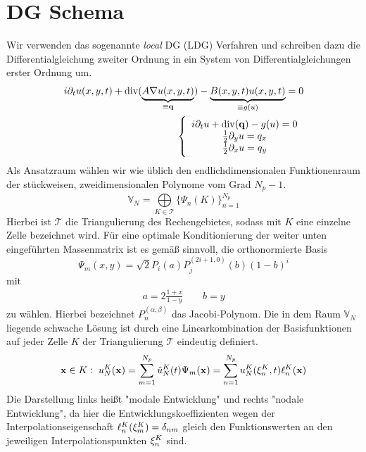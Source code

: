 \section{DG Schema}
\label{sec:DG-Schema}
Wir verwenden das sogenannte \emph{local} DG (LDG) Verfahren \cite{cockburnLDG} und schreiben dazu die Differentialgleichung zweiter Ordnung in ein System von Differentialgleichungen erster Ordnung um.
\begin{align}
  i \partial_t u(x,y,t)+\operatorname{div}(\underbrace{A\nabla u(x,y,t)}_{\equiv \vb{q}}) - \underbrace{ B(x,y,t) u(x,y,t)}_{\equiv g(u)} = 0 \\
  \left\{ \begin{array}{c}  i \partial_t u+\operatorname{div}( \vb{q}) - g(u) = 0 \\  \frac{1}{2}\partial_y u =  q_x \\ \frac{1}{2}\partial_x u =  q_y  \end{array}\right.
  \label{eq:gls1}
\end{align}
Als Ansatzraum wählen wir wie üblich den endlichdimensionalen Funktionenraum der stückweisen, zweidimensionalen Polynome vom Grad $N_p-1$.
\begin{equation}
  \mathbb{V}_N = \bigoplus\limits_{K\in\mathcal{T}}^{} \{\Psi_n(K)\}_{n=1}^{N_p}
\end{equation}
Hierbei ist $\mathcal{T}$ die Triangulierung des Rechengebietes, sodass mit $K$ eine einzelne Zelle bezeichnet wird. Für eine optimale Konditionierung der weiter unten eingeführten Massenmatrix ist es gemäß \cite{buch} sinnvoll, die orthonormierte Basis
\begin{equation}
  \Psi_m(x,y) = \sqrt{2}P_i(a)P_j^{(2i+1,0)}(b)(1-b)^i
\end{equation}
mit
\begin{align}
  a = 2\frac{1+x}{1-y} \qquad b = y
\end{align}
zu wählen. Hierbei bezeichnet $P_n^{(\alpha,\beta)}$ das Jacobi-Polynom. Die in dem Raum $\mathbb{V}_N$ liegende schwache Lösung ist durch eine Linearkombination der Basisfunktionen auf jeder Zelle $K$ der Triangulierung $\mathcal{T}$ eindeutig definiert.
\begin{align}
  \vb{x}\in K: \; u_N^K(\vb{x}) = \sum_{m=1}^{N_p}\hat{u}_N^K(t) \Psi_m(\vb{x})
  = \sum_{n=1}^{N_p} u_N^K(\vb{\xi}_n^K, t)\ell_n^K(\vb{x})
\end{align}
Die Darstellung links heißt "modale Entwicklung" und rechts "nodale Entwicklung", da hier die Entwicklungskoeffizienten wegen der Interpolationseigenschaft $\ell_n^K(\vb{\xi}_m^K)=\delta_{nm}$ gleich den Funktionswerten an den jeweiligen Interpolationspunkten $\vb{\xi}_n^K$ sind.
